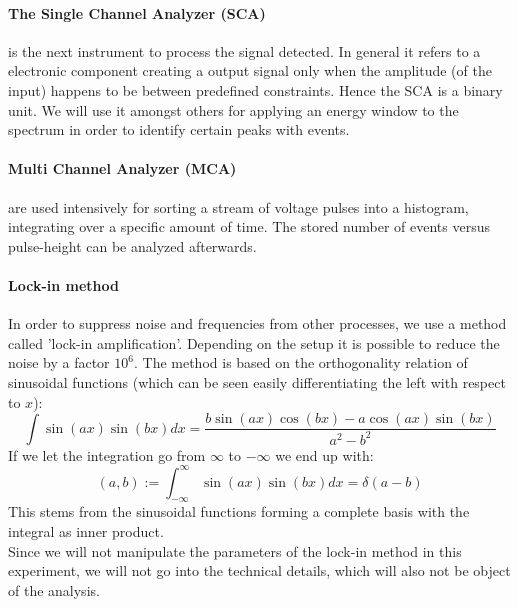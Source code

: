 \paragraph{The Single Channel Analyzer (SCA)} is the next instrument to process the signal detected. In general
it refers to a electronic component creating a output signal only when the amplitude (of the input) happens to be
between predefined constraints. Hence the SCA is a binary unit. We will use it amongst others for
applying an energy window to the spectrum in order to identify certain peaks with events. 
\paragraph{Multi Channel Analyzer (MCA)} are used intensively for sorting a stream of voltage pulses
into a histogram, integrating over a specific amount of time. The stored number of events versus pulse-height
can be analyzed afterwards.
\paragraph{Lock-in method}
In order to suppress
noise and frequencies from other processes, we use
a method called 'lock-in amplification'. Depending on the
setup it is possible to reduce the noise by a factor $10^6$. The method
is based on the orthogonality relation of sinusoidal functions (which
    can be seen easily differentiating the left with respect to $x$):
\begin{equation}
    \int \sin(a x) \sin(b x) dx =\frac{ b \sin(a x) \cos(b x)-a \cos(a x)
        \sin(b x)}{a^2-b^2}
\end{equation}
If we let the integration go from $\infty$ to $-\infty$ we end up with:
\begin{equation}
    (a,b) := \int_{-\infty}^{\infty} \sin(a x) \sin(b x) dx = \delta(a - b)
\end{equation}
This stems from the sinusoidal functions forming a complete basis with
the integral as inner product.\\
Since we will not manipulate the parameters of the lock-in method in this
experiment, we will not go into the technical details, which
will also not be object of the analysis.

